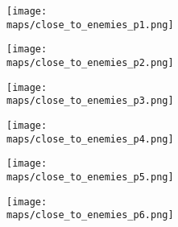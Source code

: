 \begin{center}
  \begin{figure}[h!]
    \centering
    \texttt{[image: \\maps/close\_to\_enemies\_p1.png]}
  \end{figure}
  \begin{figure}[h!]
    \centering
    \texttt{[image: \\maps/close\_to\_enemies\_p2.png]}
  \end{figure}
  \begin{figure}[h!]
    \centering
    \texttt{[image: \\maps/close\_to\_enemies\_p3.png]}
  \end{figure}
  \begin{figure}[h!]
    \centering
    \texttt{[image: \\maps/close\_to\_enemies\_p4.png]}
  \end{figure}
  \begin{figure}[h!]
    \centering
    \texttt{[image: \\maps/close\_to\_enemies\_p5.png]}
  \end{figure}
  \begin{figure}[h!]
    \centering
    \texttt{[image: \\maps/close\_to\_enemies\_p6.png]}
  \end{figure}

\end{center}
